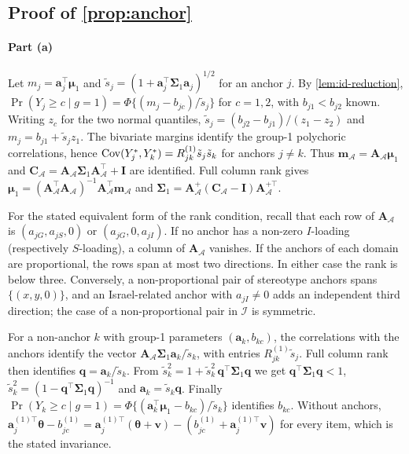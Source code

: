 \subsection{Proof of \texorpdfstring{\cref{prop:anchor}}{the anchor proposition}}\label{app:pm-anchor}

\paragraph{Part (a)}
Let $m_j=\bm a_j^\top\bm\mu_1$ and $\tilde s_j=(1+\bm a_j^\top\bm\Sigma_1\bm a_j)^{1/2}$ for an anchor $j$. By \cref{lem:id-reduction}, $\Pr(Y_j\ge c\mid g=1)=\Phi\{(m_j-b_{jc})/\tilde s_j\}$ for $c=1,2$, with $b_{j1}<b_{j2}$ known. Writing $z_c$ for the two normal quantiles, $\tilde s_j=(b_{j2}-b_{j1})/(z_1-z_2)$ and $m_j=b_{j1}+\tilde s_jz_1$. The bivariate margins identify the group-1 polychoric correlations, hence $\operatorname{Cov}(Y^*_j,Y^*_k)=R^{(1)}_{jk}\tilde s_j\tilde s_k$ for anchors $j\neq k$. Thus $\bm m_{\mathcal A}=\bm A_{\mathcal A}\bm\mu_1$ and $\bm C_{\mathcal A}=\bm A_{\mathcal A}\bm\Sigma_1\bm A_{\mathcal A}^\top+\bm I$ are identified. Full column rank gives $\bm\mu_1=(\bm A_{\mathcal A}^\top\bm A_{\mathcal A})^{-1}\bm A_{\mathcal A}^\top\bm m_{\mathcal A}$ and $\bm\Sigma_1=\bm A_{\mathcal A}^+(\bm C_{\mathcal A}-\bm I)\bm A_{\mathcal A}^{+\top}$.

For the stated equivalent form of the rank condition, recall that each row of $\bm A_{\mathcal A}$ is $(a_{jG},a_{jS},0)$ or $(a_{jG},0,a_{jI})$. If no anchor has a non-zero $I$-loading (respectively $S$-loading), a column of $\bm A_{\mathcal A}$ vanishes. If the anchors of each domain are proportional, the rows span at most two directions. In either case the rank is below three. Conversely, a non-proportional pair of stereotype anchors spans $\{(x,y,0)\}$, and an Israel-related anchor with $a_{jI}\neq0$ adds an independent third direction; the case of a non-proportional pair in $\mathcal I$ is symmetric.

For a non-anchor $k$ with group-1 parameters $(\bm a_k,b_{kc})$, the correlations with the anchors identify the vector $\bm A_{\mathcal A}\bm\Sigma_1\bm a_k/\tilde s_k$, with entries $R^{(1)}_{jk}\tilde s_j$. Full column rank then identifies $\bm q=\bm a_k/\tilde s_k$. From $\tilde s_k^2=1+\tilde s_k^2\,\bm q^\top\bm\Sigma_1\bm q$ we get $\bm q^\top\bm\Sigma_1\bm q<1$, $\tilde s_k^2=(1-\bm q^\top\bm\Sigma_1\bm q)^{-1}$ and $\bm a_k=\tilde s_k\bm q$. Finally $\Pr(Y_k\ge c\mid g=1)=\Phi\{(\bm a_k^\top\bm\mu_1-b_{kc})/\tilde s_k\}$ identifies $b_{kc}$. Without anchors, $\bm a_j^{(1)\top}\bm\theta-b^{(1)}_{jc}=\bm a_j^{(1)\top}(\bm\theta+\bm v)-(b^{(1)}_{jc}+\bm a_j^{(1)\top}\bm v)$ for every item, which is the stated invariance.

